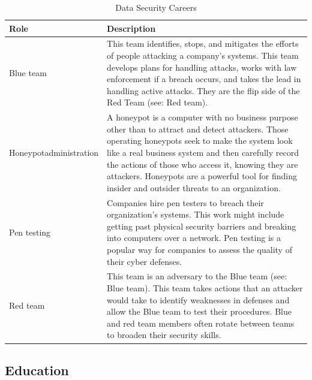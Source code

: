 \begin{table}[H]
	\begin{center}
		\caption{Data Security Careers}
		\vskip 4pt
		\begin{tabular}{p{1in}|p{3.4in}} 
			\textbf{Role} & \textbf{Description}\\
			\hline
			Blue team & This team identifies, stops, and mitigates the efforts of people attacking a company's systems. This team develops plans for handling attacks, works with law enforcement if a breach occurs, and takes the lead in handling active attacks. They are the flip side of the Red Team (see: Red team).\\
			\hline
			Honeypot\linebreak administration & A honeypot is a computer with no business purpose other than to attract and detect attackers. Those operating honeypots seek to make the system look like a real business system and then carefully record the actions of those who access it, knowing they are attackers. Honeypots are a powerful tool for finding insider and outsider threats to an organization.\\
			\hline
			Pen testing & Companies hire pen testers to breach their organization's systems. This work might include getting past physical security barriers and breaking into computers over a network. Pen testing is a popular way for companies to assess the quality of their cyber defenses.\\
			\hline
			Red team & This team is an adversary to the Blue team (see: Blue team). This team takes actions that an attacker would take to identify weaknesses in defenses and allow the Blue team to test their procedures. Blue and red team members often rotate between teams to broaden their security skills.\\
			\hline
		\end{tabular}
	\end{center}
\end{table}


\subsection{Education}



